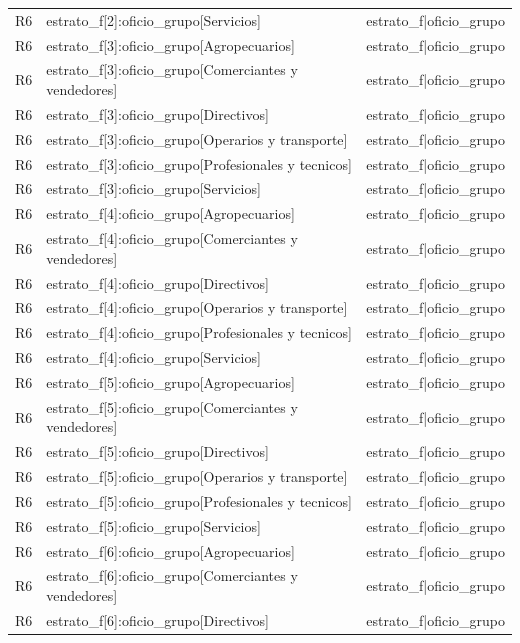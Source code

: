 \begin{longtable}{lll}
R6 & estrato\_f[2]:oficio\_grupo[Servicios] & estrato\_f|oficio\_grupo \\
R6 & estrato\_f[3]:oficio\_grupo[Agropecuarios] & estrato\_f|oficio\_grupo \\
R6 & estrato\_f[3]:oficio\_grupo[Comerciantes y vendedores] & estrato\_f|oficio\_grupo \\
R6 & estrato\_f[3]:oficio\_grupo[Directivos] & estrato\_f|oficio\_grupo \\
R6 & estrato\_f[3]:oficio\_grupo[Operarios y transporte] & estrato\_f|oficio\_grupo \\
R6 & estrato\_f[3]:oficio\_grupo[Profesionales y tecnicos] & estrato\_f|oficio\_grupo \\
R6 & estrato\_f[3]:oficio\_grupo[Servicios] & estrato\_f|oficio\_grupo \\
R6 & estrato\_f[4]:oficio\_grupo[Agropecuarios] & estrato\_f|oficio\_grupo \\
R6 & estrato\_f[4]:oficio\_grupo[Comerciantes y vendedores] & estrato\_f|oficio\_grupo \\
R6 & estrato\_f[4]:oficio\_grupo[Directivos] & estrato\_f|oficio\_grupo \\
R6 & estrato\_f[4]:oficio\_grupo[Operarios y transporte] & estrato\_f|oficio\_grupo \\
R6 & estrato\_f[4]:oficio\_grupo[Profesionales y tecnicos] & estrato\_f|oficio\_grupo \\
R6 & estrato\_f[4]:oficio\_grupo[Servicios] & estrato\_f|oficio\_grupo \\
R6 & estrato\_f[5]:oficio\_grupo[Agropecuarios] & estrato\_f|oficio\_grupo \\
R6 & estrato\_f[5]:oficio\_grupo[Comerciantes y vendedores] & estrato\_f|oficio\_grupo \\
R6 & estrato\_f[5]:oficio\_grupo[Directivos] & estrato\_f|oficio\_grupo \\
R6 & estrato\_f[5]:oficio\_grupo[Operarios y transporte] & estrato\_f|oficio\_grupo \\
R6 & estrato\_f[5]:oficio\_grupo[Profesionales y tecnicos] & estrato\_f|oficio\_grupo \\
R6 & estrato\_f[5]:oficio\_grupo[Servicios] & estrato\_f|oficio\_grupo \\
R6 & estrato\_f[6]:oficio\_grupo[Agropecuarios] & estrato\_f|oficio\_grupo \\
R6 & estrato\_f[6]:oficio\_grupo[Comerciantes y vendedores] & estrato\_f|oficio\_grupo \\
R6 & estrato\_f[6]:oficio\_grupo[Directivos] & estrato\_f|oficio\_grupo \\

\end{longtable}
